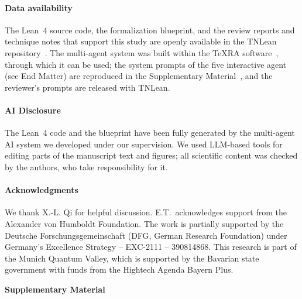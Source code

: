 \documentclass[aps,prl,twocolumn,superscriptaddress,longbibliography,10pt,footinbib]{revtex4-2}
\begin{document}
\begin{acknowledgments}
    \paragraph*{Data availability}%
    The Lean~4 source code, the formalization blueprint, and the review reports and technique notes that support this study are openly available in the TNLean repository~\cite{TNLean,TNLeanBlueprint}. The multi-agent system was built within the TeXRA software~\cite{TeXRA}, through which it can be used; the system prompts of the five interactive agent (see End Matter) are reproduced in the Supplementary Material~\cite{Supp}, and the reviewer's prompts are released with TNLean.

    \paragraph*{AI Disclosure}
    The Lean~4 code and the blueprint have been fully generated by the multi-agent AI system we developed under our supervision.
    We used LLM-based tools for editing parts of the manuscript text and figures;
    all scientific content was checked by the authors, who take responsibility for it.

    \paragraph*{Acknowledgments}%
    We thank X.-L. Qi for helpful discussion.
    E.T.\ acknowledges support from the Alexander von Humboldt Foundation.
    The work is partially supported by the Deutsche Forschungsgemeinschaft (DFG, German Research Foundation) under Germany's Excellence Strategy -- EXC-2111 -- 390814868.
    This research is part of the Munich Quantum Valley, which is supported by the Bavarian state government with funds from the Hightech Agenda Bayern Plus.
\end{acknowledgments}

\FloatBarrier


\clearpage
\appendix


\clearpage
\onecolumngrid
\begin{center}
    {\large \bf Supplementary Material}
\end{center}


\end{document}
